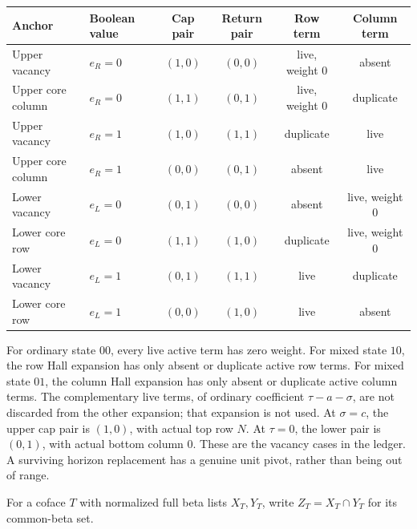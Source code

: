 \documentclass[11pt,a4paper]{amsart}
\numberwithin{equation}{section}
\theoremstyle{plain}
\theoremstyle{definition}
\begin{document}
{\small\centering
\begin{tabular}{@{}llcccc@{}}
\toprule
Anchor & Boolean value & Cap pair & Return pair & Row term & Column term\\
\midrule
Upper vacancy & \(e_R=0\) & \((1,0)\) & \((0,0)\) & live, weight \(0\) & absent\\
Upper core column & \(e_R=0\) & \((1,1)\) & \((0,1)\) & live, weight \(0\) & duplicate\\
Upper vacancy & \(e_R=1\) & \((1,0)\) & \((1,1)\) & duplicate & live\\
Upper core column & \(e_R=1\) & \((0,0)\) & \((0,1)\) & absent & live\\
\midrule
Lower vacancy & \(e_L=0\) & \((0,1)\) & \((0,0)\) & absent & live, weight \(0\)\\
Lower core row & \(e_L=0\) & \((1,1)\) & \((1,0)\) & duplicate & live, weight \(0\)\\
Lower vacancy & \(e_L=1\) & \((0,1)\) & \((1,1)\) & live & duplicate\\
Lower core row & \(e_L=1\) & \((0,0)\) & \((1,0)\) & live & absent\\
\bottomrule
\end{tabular}\par}

For ordinary state \(00\), every live active term has zero weight.
For mixed state \(10\), the row Hall expansion has only absent or
duplicate active row terms.  For mixed state \(01\), the column Hall
expansion has only absent or duplicate active column terms.
The complementary live terms, of ordinary coefficient
\(\tau-a-\sigma\), are not discarded from the other expansion;
that expansion is not used.
At \(\sigma=c\), the upper cap pair is \((1,0)\), with actual top
row \(N\).  At \(\tau=0\), the lower pair is \((0,1)\), with actual
bottom column \(0\).  These are the vacancy cases in the ledger.
A surviving horizon replacement has a genuine unit pivot, rather
than being out of range.

For a coface \(T\) with normalized full beta lists \(X_T,Y_T\), write
\(Z_T=X_T\cap Y_T\) for its common-beta set.
\end{document}
